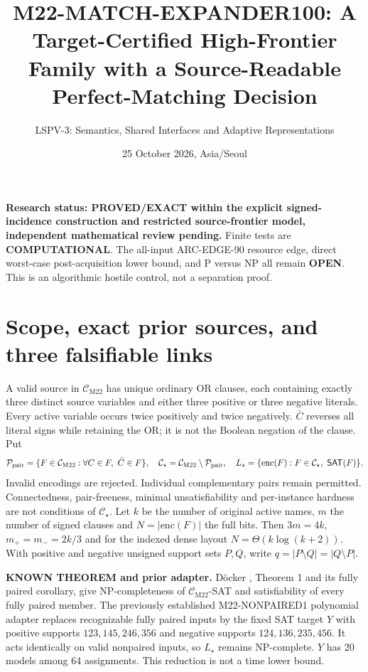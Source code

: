 \documentclass[11pt]{article}
\title{M22-MATCH-EXPANDER100: A Target-Certified High-Frontier Family with a Source-Readable Perfect-Matching Decision}
\author{LSPV-3: Semantics, Shared Interfaces and Adaptive Representations}
\date{25 October 2026, Asia/Seoul}
\newcommand{\CM}{\mathcal C_{\mathrm{M22}}}
\newcommand{\CS}{\mathcal C_\star}
\newcommand{\SAT}{\mathsf{SAT}}
\begin{document}
\maketitle

\noindent\textbf{Research status: PROVED/EXACT within the explicit signed-incidence construction and restricted source-frontier model, independent mathematical review pending.} Finite tests are \textbf{COMPUTATIONAL}. The all-input ARC-EDGE-90 resource edge, direct worst-case post-acquisition lower bound, and P versus NP all remain \textbf{OPEN}. This is an algorithmic hostile control, not a separation proof.

\section{Scope, exact prior sources, and three falsifiable links}
A valid source in $\CM$ has unique ordinary OR clauses, each containing exactly three distinct source variables and either three positive or three negative literals. Every active variable occurs twice positively and twice negatively. $\bar C$ reverses all literal signs while retaining the OR; it is not the Boolean negation of the clause. Put
\[
\mathcal P_{\rm pair}=\{F\in\CM:\forall C\in F,\ \bar C\in F\},
\quad \CS=\CM\setminus\mathcal P_{\rm pair},
\quad L_\star=\{\mathrm{enc}(F):F\in\CS,\ \SAT(F)\}.
\]
Invalid encodings are rejected. Individual complementary pairs remain permitted. Connectedness, pair-freeness, minimal unsatisfiability and per-instance hardness are not conditions of $\CS$. Let $k$ be the number of original active names, $m$ the number of signed clauses and $N=|\mathrm{enc}(F)|$ the full bits. Then $3m=4k$, $m_+=m_-=2k/3$ and for the indexed dense layout $N=\Theta(k\log(k+2))$. With positive and negative unsigned support sets $P,Q$, write $q=|P\setminus Q|=|Q\setminus P|$.

\noindent\textbf{KNOWN THEOREM and prior adapter.} D\"ocker \cite{docker}, Theorem 1 and its fully paired corollary, give NP-completeness of $\CM$-SAT and satisfiability of every fully paired member. The previously established M22-NONPAIRED1 polynomial adapter replaces recognizable fully paired inputs by the fixed SAT target $Y$ with positive supports $123,145,246,356$ and negative supports $124,136,235,456$. It acts identically on valid nonpaired inputs, so $L_\star$ remains NP-complete. $Y$ has 20 models among 64 assignments. This reduction is not a time lower bound.
\end{document}
